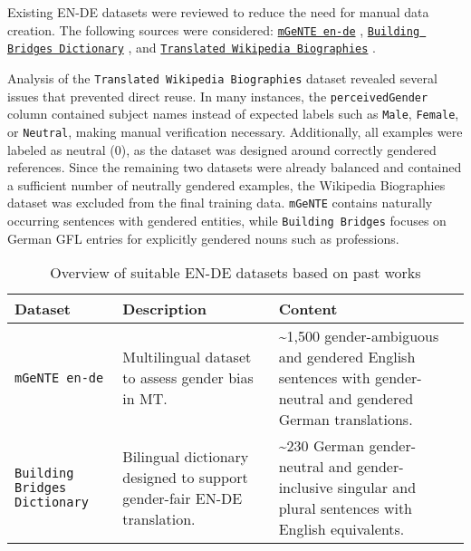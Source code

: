     Existing EN-DE datasets were reviewed to reduce the need for manual data creation. The following sources were considered: \texttt{\href{https://huggingface.co/datasets/FBK-MT/mGeNTE}{mGeNTE en-de}} \parencite{savoldiMGeNTEMultilingualResource2025}, \texttt{\href{https://github.com/g8a9/building-bridges-gender-fair-german-mt}{Building Bridges Dictionary}} \parencite{lardelliBuildingBridgesDataset2024}, and \texttt{\href{https://research.google/blog/a-dataset-for-studying-gender-bias-in-translation/}{Translated Wikipedia Biographies}} \parencite{stellaDatasetStudyingGender2021}.

    Analysis of the \texttt{Translated Wikipedia Biographies} dataset revealed several issues that prevented direct reuse. In many instances, the \texttt{perceivedGender} column contained subject names instead of expected labels such as \texttt{Male}, \texttt{Female}, or \texttt{Neutral}, making manual verification necessary. Additionally, all examples were labeled as neutral (0), as the dataset was designed around correctly gendered references. Since the remaining two datasets were already balanced and contained a sufficient number of neutrally gendered examples, the Wikipedia Biographies dataset was excluded from the final training data. \texttt{mGeNTE} contains naturally occurring sentences with gendered entities, while \texttt{Building Bridges} focuses on German GFL entries for explicitly gendered nouns such as professions. 

\begin{table}[ht!]
    \centering
    \renewcommand{\arraystretch}{1.3}
    \begin{tabularx}{\textwidth}{|>{\raggedright\arraybackslash}X|>{\raggedright\arraybackslash}X|>{\raggedright\arraybackslash}X|}
    \hline
    \textbf{Dataset} & \textbf{Description} & \textbf{Content} \\ \hline
    \texttt{mGeNTE en-de} \parencite{savoldiMGeNTEMultilingualResource2025} & Multilingual dataset to assess gender bias in MT. & \textasciitilde1,500 gender-ambiguous and gendered English sentences with gender-neutral and gendered German translations. \\ \hline
    \texttt{Building Bridges Dictionary} \parencite{lardelliBuildingBridgesDataset2024} & Bilingual dictionary designed to support gender-fair EN-DE translation. & \textasciitilde230 German gender-neutral and gender-inclusive singular and plural sentences with English equivalents. \\ \hline
    \end{tabularx}
    \caption{Overview of suitable EN-DE datasets based on past works}
    \label{tab:available_datasets}
\end{table}

